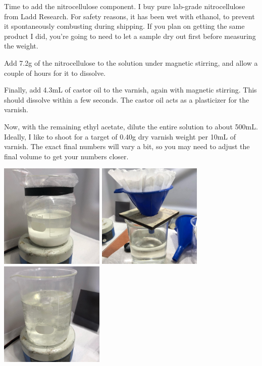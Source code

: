 \documentclass[11pt]{article}
\begin{document}
Time to add the nitrocellulose component. I buy pure lab-grade nitrocellulose from Ladd Research. For safety reasons, it has been wet with ethanol, to prevent it spontaneously combusting during shipping. If you plan on getting the same product I did, you're going to need to let a sample dry out first before measuring the weight.\newline

Add 7.2g of the nitrocellulose to the solution under magnetic stirring, and allow a couple of hours for it to dissolve.\newline

Finally, add 4.3mL of castor oil to the varnish, again with magnetic stirring. This should dissolve within a few seconds.  The castor oil acts as a plasticizer for the varnish.\newline

Now, with the remaining ethyl acetate, dilute the entire solution to about 500mL. Ideally, I like to shoot for a target of 0.40g dry varnish weight per 10mL of varnish. The exact final numbers will vary a bit, so you may need to adjust the final volume to get your numbers closer.\newline

\begin{center}
\includegraphics[width=5cm, height=5cm]{img/part1_38.jpg}
\includegraphics[width=5cm, height=5cm]{img/part1_39.jpg}
\includegraphics[width=5cm, height=5cm]{img/part1_40.jpg}
\end{center}
\end{document}
